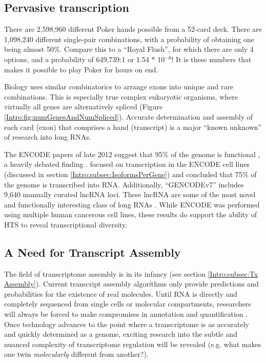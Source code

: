   \subsection{Pervasive transcription}
    \label{Disc:subsec:Pervasive Tx}

    There are 2,598,960 different Poker hands possible from a 52-card deck. There are 1,098,240 different single-pair combinations, with a probability of obtaining one being almost 50\%. Compare this to a ``Royal Flush'', for which there are only 4 options, and a probability of 649,739:1 or 1.54 * 10$^{-6}$! It is these numbers that makes it possible to play Poker for hours on end. 

    Biology uses similar combinatorics to arrange exons into unique and rare combinations. This is especially true complex eukaryotic organisms, where virtually all genes are alternatively spliced (Figure \ref{Intro:fig:numGenesAndNumSpliced}). Accurate determination and assembly of each card (exon) that comprises a hand (transcript) is a major ``known unknown'' \citep{Rumsfeld2011} of research into long RNAs.

    The ENCODE papers of late 2012 suggest that 95\% of the genome is functional \citep{Dunham2012}, a heavily debated finding \citep{Graur2013,Bhattacharjee2014}. \citet{Djebali2012} focused on transcription in the ENCODE cell lines (discussed in section \ref{Intro:subsec:IsoformsPerGene}) and concluded that 75\% of the genome is transcribed into RNA. Additionally, ``GENCODEv7'' includes 9,640 manually curated lncRNA loci. These lncRNA are some of the most novel and functionally interesting class of long RNAs \citep{Derrien2012,Pauli2011}. While ENCODE was performed using multiple human cancerous cell lines, these results do support the ability of HTS to reveal transcriptional diversity.

  \subsection{A Need for Transcript Assembly}
    \label{Disc:subsec:need for Tx assembly}

    The field of transcriptome assembly is in its infancy (see section \ref{Intro:subsec:Tx Assembly}). Current transcript assembly algorithms only provide predictions and probabilities for the existence of real molecules. Until RNA is directly and completely sequenced from single cells or molecular compartments, researchers will always be forced to make compromises in annotation and quantification \citep{Ozsolak2010,Steijger2013}. Once technology advances to the point where a transcriptome is as accurately and quickly determined as a genome, exciting research into the subtle and nuanced complexity of transcriptome regulation will be revealed (e.g. what makes one twin \textit{molecularly} different from another?).

